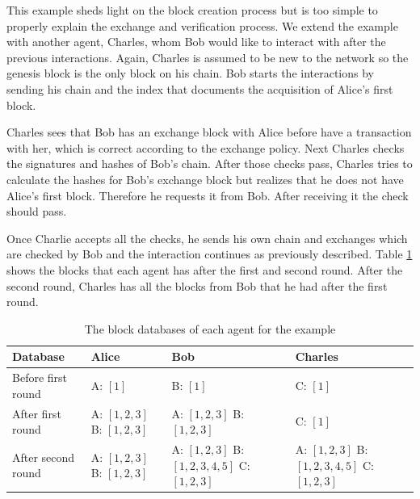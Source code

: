 This example sheds light on the block creation process but is too simple to properly explain the 
exchange and verification process. We extend the example with another agent, Charles, whom Bob would
like to interact with after the previous interactions. Again, Charles is assumed to be new to the 
network so the genesis block is the only block on his chain. Bob starts the interactions by sending
his chain and the index that documents the acquisition of Alice's first block. 

Charles sees that Bob has an exchange block with Alice before have a transaction with her, which is 
correct according to the exchange policy. Next Charles checks the signatures and hashes of Bob's chain. 
After those checks pass, Charles tries to calculate the hashes for Bob's exchange block but realizes
that he does not have Alice's first block. Therefore he requests it from Bob. After receiving it the
check should pass. 

Once Charlie accepts all the checks, he sends his own chain and exchanges which are checked by Bob
and the interaction continues as previously described. Table \ref{tab:blocks_example} shows the
blocks that each agent has after the first and second round. After the second round, Charles has 
all the blocks from Bob that he had after the first round.

\begin{table}[h!]
    \centering
    \caption{The block databases of each agent for the example}
    \label{tab:blocks_example}
    \begin{tabular}{p{4cm}|p{3cm}|p{4cm}|p{3cm}}
        \toprule
        Database & Alice & Bob & Charles \\
        \midrule
        Before first round & A: $[1]$ & B: $[1]$ & C: $[1]$ \\ \hline 
        After first round & A: $[1, 2, 3]$ \newline B: $[1, 2, 3]$ & A: $[1, 2, 3]$ \newline B: $[1, 2, 3]$ & C: $[1]$ \\ \hline
        After second round &  A: $[1, 2, 3]$ \newline B: $[1, 2, 3]$ & A: $[1, 2, 3]$ \newline B: $[1, 2, 3, 4, 5]$ \newline C: $[1, 2, 3]$ & A: $[1, 2, 3]$ \newline B: $[1, 2, 3, 4, 5]$ \newline C: $[1, 2, 3]$ \\
        \bottomrule
    \end{tabular}
\end{table}


